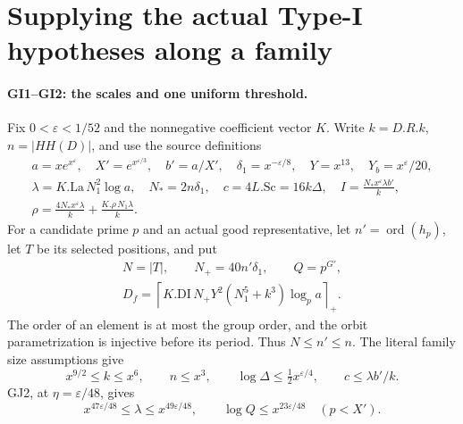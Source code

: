 \section{Supplying the actual Type-I hypotheses along a family}
\label{sec:type-one-family}


\paragraph{GI1--GI2: the scales and one uniform threshold.}
Fix $0<\varepsilon<1/52$ and the nonnegative coefficient vector
$K$. Write $k=D.R.k$, $n=|HH(D)|$, and use the source definitions
\[
\begin{gathered}
 a=xe^{x^\varepsilon},\quad
 X'=e^{x^{\varepsilon/3}},\quad
 b'=a/X',\quad \delta_1=x^{-\varepsilon/8},\quad
 Y=x^{13},\quad Y_b=x^\varepsilon/20,\\
 \lambda=K.\mathrm{La}\,N_1^2\log a,\quad
 N_*=2n\delta_1,\quad
 c=4L.\mathrm{Sc}=16k\Delta,\quad
 I=\frac{N_*x^\varepsilon\lambda b'}k,\\
 \rho=\frac{4N_*x^\varepsilon\lambda}k
          +\frac{K.\rho\,N_1\lambda}k.
\end{gathered}                                                    \tag{GI.1}
\]
For a candidate prime $p$ and an actual good representative,
let $n'=\operatorname{ord}(h_p)$, let $T$ be its selected
positions, and put
\[
\begin{gathered}
 N=|T|,\qquad N_+=40n'\delta_1,\qquad Q=p^{G'},\\
 D_f=\left\lceil K.\mathrm{DI}\,N_+Y^2
                    (N_1^5+k^3)\log_p a\right\rceil_+.
\end{gathered}                                                    \tag{GI.2}
\]
The order of an element is at most the group order, and the
orbit parametrization is injective before its period. Thus
$N\le n'\le n$. The literal family size assumptions give
\[
 x^{9/2}\le k\le x^6,\qquad n\le x^3,\qquad
 \log\Delta\le\tfrac12x^{\varepsilon/4},\qquad
 c\le\lambda b'/k.                                      \tag{GI.3}
\]
GJ2, at $\eta=\varepsilon/48$, gives
\[
 x^{47\varepsilon/48}\le\lambda\le x^{49\varepsilon/48},
 \qquad \log Q\le x^{23\varepsilon/48}\quad(p<X').        \tag{GI.4}
\]
